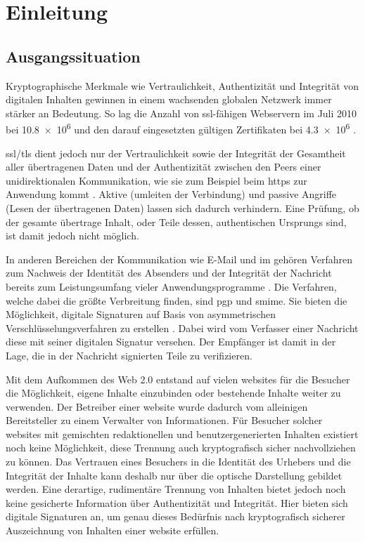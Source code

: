 
\chapter{Einleitung}
\label{chap:Einleitung}

\section{Ausgangssituation}
\label{sec:Einleitung:ausgangssituation}
Kryptographische Merkmale wie Vertraulichkeit, Authentizität und Integrität von digitalen Inhalten gewinnen in einem wachsenden globalen Netzwerk immer
stärker an Bedeutung. So lag die Anzahl von \gls{ssl}-fähigen Webservern im Juli 2010 bei \num{10.8e6} und den darauf eingesetzten gültigen Zertifikaten bei
\num{4.3e6} \cite{ssliverse:eff}.

\gls{ssl}/\gls{tls} dient jedoch nur der Vertraulichkeit sowie der Integrität der Gesamtheit aller übertragenen Daten und der Authentizität zwischen den Peers
einer unidirektionalen  Kommunikation, wie sie zum Beispiel beim \gls{https} zur Anwendung kommt \cite{kits}. Aktive (umleiten der Verbindung) und passive
Angriffe (Lesen der übertragenen Daten) lassen sich dadurch verhindern. Eine Prüfung, ob der gesamte übertrage Inhalt, oder Teile dessen, authentischen
Ursprungs sind, ist damit jedoch nicht möglich.

In anderen Bereichen der Kommunikation wie E-Mail und \gls{im} gehören Verfahren zum Nachweis der Identität des Absenders und der Integrität der Nachricht
bereits zum Leistungsumfang vieler Anwendungsprogramme \cite{Garfinkel:2003:EEC:1123196.1123244,krypto-pki-internet}.
Die Verfahren, welche dabei die größte Verbreitung finden, sind \gls{pgp} und \gls{smime}. Sie bieten die Möglichkeit, digitale Signaturen auf Basis von asymmetrischen
Verschlüsselungsverfahren zu erstellen \cite{kits}. Dabei wird vom Verfasser einer Nachricht diese mit seiner digitalen Signatur versehen. Der Empfänger ist damit
in der Lage, die in der Nachricht signierten Teile zu verifizieren.

Mit dem Aufkommen des Web 2.0 entstand auf vielen \glspl{website} für die Besucher die Möglichkeit, eigene Inhalte einzubinden oder bestehende Inhalte weiter zu
verwenden. Der Betreiber einer \gls{website} wurde dadurch vom alleinigen Bereitsteller zu einem Verwalter von Informationen. Für Besucher solcher
\glspl{website} mit gemischten redaktionellen und benutzergenerierten Inhalten existiert noch keine Möglichkeit, diese Trennung auch kryptografisch sicher
nachvollziehen zu können. Das Vertrauen eines Besuchers in die Identität des Urhebers und die Integrität der Inhalte kann deshalb nur über die optische
Darstellung gebildet werden. Eine derartige, rudimentäre Trennung von Inhalten bietet jedoch noch keine gesicherte Information über Authentizität und
Integrität. Hier bieten sich digitale Signaturen an, um genau dieses Bedürfnis nach kryptografisch sicherer Auszeichnung von Inhalten einer \gls{website} erfüllen.

